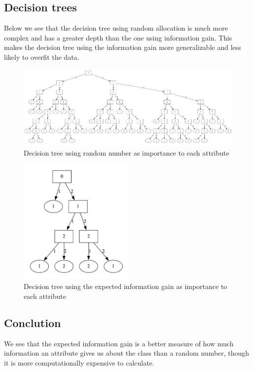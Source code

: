 \documentclass{article}
\begin{document}
\subsection*{Decision trees}

Below we see that the decision tree using random allocation is much more complex and has a greater depth than the one using information gain.
This makes the decision tree using the information gain more generalizable and less likely to overfit the data.

\begin{figure}[t]
    \centering
    \includegraphics[width=\linewidth]{random.png}
    \caption{Decision tree using random number as importance to each attribute}
    \label{fig:image2}
\end{figure}

\begin{figure}[t]
    \centering
    \includegraphics[width=0.5\textwidth]{information_gain.png}
    \caption{Decision tree using the expected information gain as importance to each attribute}
    \label{fig:image3}
\end{figure}

\subsection*{Conclution}

We see that the expected information gain is a better measure of how much information an attribute gives us about the class than a random number, though it is more computationally expensive to calculate.
\end{document}
